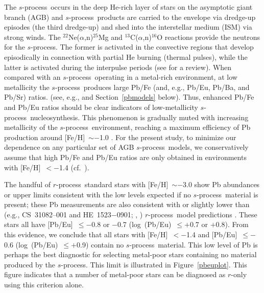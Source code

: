 \documentclass{emulateapj}
\def\rpro{\mbox{$r$-process}}
\def\spro{\mbox{$s$-process}}
\begin{document}
The \spro\ occurs in the deep He-rich layer of stars on the asymptotic
giant branch (AGB)
and \spro\ products are carried to the envelope via dredge-up episodes 
(the third dredge-up) 
and shed into the interstellar medium (ISM) via strong winds. 
The $^{22}$Ne($\alpha$,n)$^{25}$Mg and 
$^{13}$C($\alpha$,n)$^{16}$O reactions provide the neutrons for the \spro.
The former is activated in the convective regions 
that develop episodically in connection with partial 
He burning (thermal pulses), 
while the latter is activated during the interpulse periods 
(see \citealt{busso99} for a review). 
When compared with an \spro\ operating in a metal-rich environment,
at low metallicity the \spro\ produces large Pb/Fe 
(and, e.g., Pb/Eu, Pb/Ba, and Pb/Sr) ratios.
(see, e.g., \citealt{gallino98} and Section~\ref{pbmodels} below).
Thus, enhanced Pb/Fe and Pb/Eu ratios should be clear indicators
of low-metallicity \spro\ nucleosynthesis.
This phenomenon is gradually muted with increasing metallicity
of the \spro\ environment,
reaching a maximum efficiency of Pb production 
around [Fe/H]~$\sim -$1.0 \citep{travaglio01}.
For the present study, to minimize our dependence on any particular
set of AGB \spro\ models, we conservatively assume that high Pb/Fe and Pb/Eu
ratios are only obtained in environments with [Fe/H]~$< -$1.4
(cf.\ \citealt{bisterzo10}).

The handful of \rpro\ standard stars with [Fe/H]~$\sim -$3.0
show Pb abundances or upper limits consistent with the low
levels expected if no \spro\ material is present;
these Pb measurements are also consistent with or slightly lower than
(e.g., \mbox{CS~31082--001} and \mbox{HE~1523$-$0901};
\citealt{plez04}, \citealt{frebel07})
\rpro\ model predictions \citep{kratz04,roederer09b}.
These stars all have [Pb/Eu]~$\leq -$0.8 or $-$0.7
(log~(Pb/Eu)~$\leq +$0.7 or $+$0.8).
From this evidence, we conclude that all stars with [Fe/H]~$< -$1.4 and 
[Pb/Eu]~$\leq -$0.6
(log~(Pb/Eu)~$\leq +$0.9) contain no \spro\ material.
This low level of Pb is perhaps the best diagnostic for selecting
metal-poor stars containing no material produced by the \spro.
This limit is illustrated in Figure~\ref{pbeuplot}.
This figure indicates that a number of metal-poor stars can 
be diagnosed as $r$-only using this criterion alone.
\end{document}
